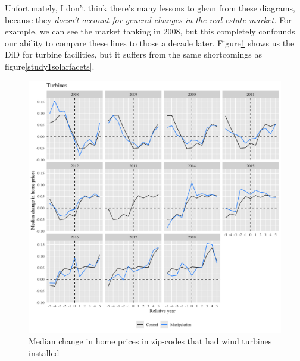 \documentclass{article}
\begin{document}
Unfortunately, I don't think there's many lessons to glean from these diagrams, because they \emph{doesn't account for general changes in the real estate market.}
For example, we can see the market tanking in 2008, but this completely confounds our ability to compare these lines to those a decade later.
Figure\ref{study1turbinefacets} shows us the DiD for turbine facilities, but it suffers from the same shortcomings as figure\ref{study1solarfacets}.
\begin{figure}[h]
\centering
\includegraphics[width=0.9\linewidth]
{study1_turbine_facets.png} 
\caption{Median change in home prices in zip-codes that had wind turbines installed}
\label{study1turbinefacets}
\end{figure}
\end{document}
